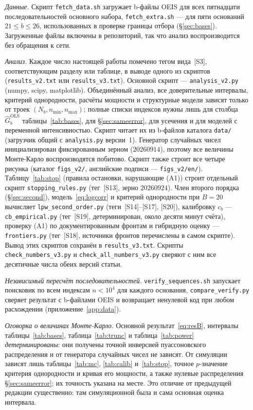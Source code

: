 \documentclass[11pt,a4paper]{article}
\theoremstyle{plain}
\theoremstyle{remark}
\begin{document}
\emph{Данные.} Скрипт \texttt{fetch\_data.sh} загружает b-файлы OEIS для всех
пятнадцати последовательностей основного набора, \texttt{fetch\_extra.sh} --- для
пяти оснований $21\le b\le26$, использованных в проверке границы отбора
(\S\ref{sec:bases}). Загруженные файлы включены в репозиторий, так что анализ
воспроизводится без обращения к сети.

\emph{Анализ.} Каждое число настоящей работы помечено тегом вида~[S3],
соответствующим разделу или таблице, в выводе одного из скриптов
(\texttt{results\_v2.txt} или \texttt{results\_v3.txt}). Основной скрипт ---
\texttt{analysis\_v2.py} (numpy, scipy, matplotlib). Объединённый анализ, все
доверительные интервалы, критерий однородности, расчёты мощности и структурные
модели зависят только от троек $(N_b,n_{\min},n_{\max})$; полные списки индексов
нужны лишь для столбца $\hat G^{\mathrm{OLS}}_b$ таблицы~\ref{tab:bases}, для
\S\ref{sec:sameerror}, для усечения и для моделей с переменной интенсивностью.
Скрипт читает их из b-файлов каталога \texttt{data/} (загрузчик общий с
\texttt{analysis.py} версии~1). Генератор случайных чисел инициализирован
фиксированным зерном ($20260914$), поэтому все величины Монте-Карло воспроизводятся
побитово. Скрипт также строит все четыре рисунка (каталог \texttt{figs\_v2/},
английские подписи --- \texttt{figs\_v2/en/}). Таблицу~\ref{tab:stop}
(правила остановки, нарушающие (A1)) строит отдельный скрипт
\texttt{stopping\_rules.py} (тег~[S13], зерно $20260924$). Член второго
порядка (\S\ref{sec:second}), модель~\eqref{eq:logcorr} и критерий однородности при
$B=20$ вычисляет \texttt{lpw\_second\_order.py} (теги~[S14]--[S17], [S20]),
калибровку $c_b$ --- \texttt{cb\_empirical.py} (тег~[S19], детерминирован, около
десяти минут счёта), проверку (A1) по документированным фронтам и гибридную
оценку --- \texttt{frontiers.py} (тег~[S18], источники фронтов перечислены в самом
скрипте). Вывод этих скриптов сохранён в \texttt{results\_v3.txt}. Скрипты
\texttt{check\_numbers\_v3.py} и \texttt{check\_all\_numbers\_v3.py} сверяют с ним
все десятичные числа обеих версий статьи.

\emph{Независимый пересчёт последовательностей.} \texttt{verify\_sequences.sh}
запускает поисковик по всем индексам $n<10^4$ для каждого основания,
\texttt{compare\_verify.py} сверяет результат с b-файлами OEIS и возвращает
ненулевой код при любом расхождении (приложение~\ref{app:data}).

\emph{Оговорка о величинах Монте-Карло.} Основной результат~\eqref{eq:resB},
интервалы таблицы~\ref{tab:bases}, таблица~\ref{tab:trunc} и
таблица~\ref{tab:power} \emph{детерминированы}: они получены точной инверсией
пуассоновского распределения и от генератора случайных чисел не зависят. От
симуляции зависят лишь таблицы~\ref{tab:mc}, \ref{tab:calib} и~\ref{tab:stop}, точное
$p$-значение критерия однородности и кривая его мощности, а также нулевые
распределения \S\ref{sec:sameerror}; их точность указана на месте. Это отличие от
предыдущей редакции существенно: там симуляционной была и сама основная оценка
интервала.
\end{document}
